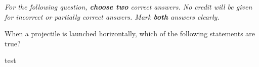 \documentclass[10pt]{examdesign}
\begin{document}
\begin{multiplechoice} [title={Multiple Correct Multiple Choice},
	rearrange=no]
	\textit{For the following question, \textbf{choose two} correct answers.  No credit will be given for incorrect or partially correct answers.  Mark \textbf{both} answers clearly.} 



\begin{question}
	When a projectile is launched horizontally, which of the following statements are true?
\end{question}







\end{multiplechoice}

\begin{shortanswer}[title={Free Response}]

\begin{question}
	test
	\end{question}


	\end{shortanswer}
\end{document}
